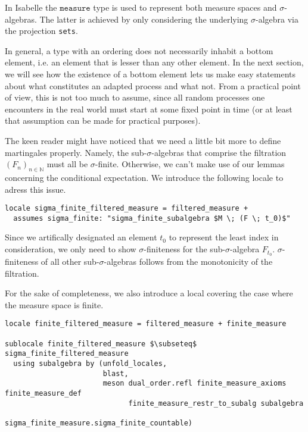 \begin{remark}
	In Isabelle the $\texttt{measure}$ type is used to represent both measure spaces and $\sigma$-algebras. The latter is achieved by only considering the underlying $\sigma$-algebra via the projection \texttt{sets}.
\end{remark}

In general, a type with an ordering does not necessarily inhabit a bottom element, i.e. an element that is lesser than any other element. In the next section, we will see how the existence of a bottom element lets us make easy statements about what constitutes an adapted process and what not. From a practical point of view, this is not too much to assume, since all random processes one encounters in the real world must start at some fixed point in time (or at least that assumption can be made for practical purposes).

The keen reader might have noticed that we need a little bit more to define martingales properly. Namely, the sub-$\sigma$-algebras that comprise the filtration $(F_n)_{n \in \mathbb{N}}$ must all be $\sigma$-finite. Otherwise, we can't make use of our lemmas concerning the conditional expectation. We introduce the following locale to adress this issue.

\begin{isadefinition}
{\small
\begin{lstlisting}[style=isabelle]
locale sigma_finite_filtered_measure = filtered_measure +
  assumes sigma_finite: "sigma_finite_subalgebra $M \; (F \; t_0)$"
  \end{lstlisting}
}
\end{isadefinition}

\begin{remark}
	Since we artifically designated an element $t_0$ to represent the least index in consideration, we only need to show $\sigma$-finiteness for the sub-$\sigma$-algebra $F_{t_0}$. $\sigma$-finiteness of all other sub-$\sigma$-algebras follows from the monotonicity of the filtration.
\end{remark}

For the sake of completeness, we also introduce a local covering the case where the measure space is finite.

\begin{isadefinition}
{\small
\begin{lstlisting}[style=isabelle]
locale finite_filtered_measure = filtered_measure + finite_measure

sublocale finite_filtered_measure $\subseteq$ sigma_finite_filtered_measure 
  using subalgebra by (unfold_locales, 
  					   blast, 
					   meson dual_order.refl finite_measure_axioms finite_measure_def 
							 finite_measure_restr_to_subalg subalgebra
							 sigma_finite_measure.sigma_finite_countable)

  \end{lstlisting}
}
\end{isadefinition}


